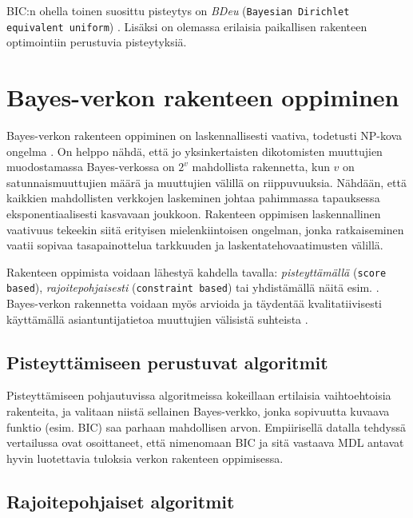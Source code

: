 BIC:n ohella toinen suosittu pisteytys on \emph{BDeu} (\texttt{Bayesian Dirichlet equivalent uniform})  \citep{scanagatta_survey_2019}. Lisäksi on olemassa erilaisia paikallisen rakenteen optimointiin perustuvia pisteytyksiä. 

\section{Bayes-verkon rakenteen oppiminen}

Bayes-verkon rakenteen oppiminen on laskennallisesti vaativa, todetusti NP-kova ongelma \citep{chickering_large-sample_2004}. On helppo nähdä, että jo yksinkertaisten dikotomisten muuttujien muodostamassa Bayes-verkossa on $2^v$ mahdollista rakennetta, kun $v$ on satunnaismuuttujien määrä ja muuttujien välillä on riippuvuuksia. Nähdään, että kaikkien mahdollisten verkkojen laskeminen johtaa pahimmassa tapauksessa eksponentiaalisesti kasvavaan joukkoon. Rakenteen oppimisen laskennallinen vaativuus tekeekin siitä erityisen mielenkiintoisen ongelman, jonka ratkaiseminen vaatii sopivaa tasapainottelua tarkkuuden ja laskentatehovaatimusten välillä.

Rakenteen oppimista voidaan lähestyä kahdella tavalla: \emph{pisteyttämällä} (\texttt{score based}),  \emph{rajoitepohjaisesti} (\texttt{constraint based}) \citep{ramsahai_connecting_2020, scutari_learning_2010} tai yhdistämällä näitä esim. \citet{li_hybrid_2018}. Bayes-verkon rakennetta voidaan myös arvioida ja täydentää kvalitatiivisesti käyttämällä asiantuntijatietoa muuttujien välisistä suhteista \citep{ruggeri_bayesian_2008, myllymaki_bayes-verkkojen_1998}.

\subsection{Pisteyttämiseen perustuvat algoritmit}

Pisteyttämiseen pohjautuvissa algoritmeissa kokeillaan ertilaisia vaihtoehtoisia rakenteita, ja valitaan niistä sellainen Bayes-verkko, jonka sopivuutta kuvaava funktio (esim. BIC) saa parhaan mahdollisen arvon. Empiirisellä datalla tehdyssä vertailussa \citet{liu_empirical_2012} ovat osoittaneet, että nimenomaan BIC ja sitä vastaava MDL antavat hyvin luotettavia tuloksia verkon rakenteen oppimisessa.  

\subsection{Rajoitepohjaiset algoritmit}

